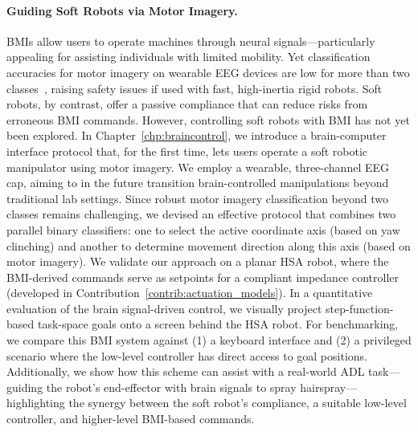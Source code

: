 \paragraph{Guiding Soft Robots via Motor Imagery.}
\glspl{BMI} allow users to operate machines through neural signals—particularly appealing for assisting individuals with limited mobility. Yet classification accuracies for motor imagery on wearable EEG devices are low for more than two classes~\citep{arpaia2022non, lee2024noir}, raising safety issues if used with fast, high-inertia rigid robots. Soft robots, by contrast, offer a passive compliance that can reduce risks from erroneous \gls{BMI} commands. However, controlling soft robots with \gls{BMI} has not yet been explored.
%
In Chapter~\ref{chp:braincontrol}, we introduce a brain-computer interface protocol that, for the first time, lets users operate a soft robotic manipulator using motor imagery. We employ a wearable, three-channel \gls{EEG} cap, aiming to in the future transition brain-controlled manipulations beyond traditional lab settings. Since robust motor imagery classification beyond two classes remains challenging, we devised an effective protocol that combines two parallel binary classifiers: one to select the active coordinate axis (based on yaw clinching) and another to determine movement direction along this axis (based on motor imagery). We validate our approach on a planar \gls{HSA} robot, where the \gls{BMI}-derived commands serve as setpoints for a compliant impedance controller (developed in Contribution~\ref{contrib:actuation_models}).
In a quantitative evaluation of the brain signal-driven control, we visually project step-function-based task-space goals onto a screen behind the \gls{HSA} robot.
% 
For benchmarking, we compare this \gls{BMI} system against (1) a keyboard interface and (2) a privileged scenario where the low-level controller has direct access to goal positions. Additionally, we show how this scheme can assist with a real-world \gls{ADL} task—guiding the robot’s end-effector with brain signals to spray hairspray—highlighting the synergy between the soft robot’s compliance, a suitable low-level controller, and higher-level \gls{BMI}-based commands.

